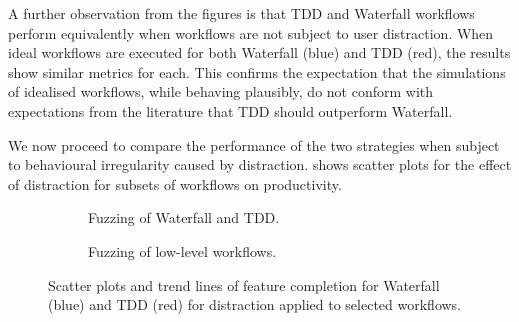 \documentclass{llncs}
\begin{document}
A further observation from the figures is that TDD and Waterfall workflows perform equivalently when workflows are not
subject to user distraction.  When ideal workflows are executed for both Waterfall (blue) and TDD (red), the results
show similar metrics for each.  This confirms the expectation
that the simulations of idealised workflows, while behaving plausibly, do not conform with expectations from the
literature that TDD should outperform Waterfall.

We now proceed to compare the performance of the two 
strategies when subject to behavioural irregularity
caused by distraction.  shows scatter plots for the effect of distraction for
subsets of workflows on productivity.%
\begin{figure}[t]
  \centering
  \hfill
  \begin{subfigure}[t]{2.3in}%
    \caption{Fuzzing of Waterfall and TDD.}
    \label{fig:fuzzing-features:WF}
  \end{subfigure}
  \hfill
  \begin{subfigure}[t]{2.3in}
    \caption{Fuzzing of low-level workflows.}  
  \label{fig:fuzzing-features:CTIDR}
  \end{subfigure}
  \hfill

  \caption{Scatter plots and trend lines of feature completion for Waterfall (blue) and TDD (red) for distraction
    applied to selected workflows.}
  \label{fig:fuzzing-features}
\end{figure}
\end{document}
